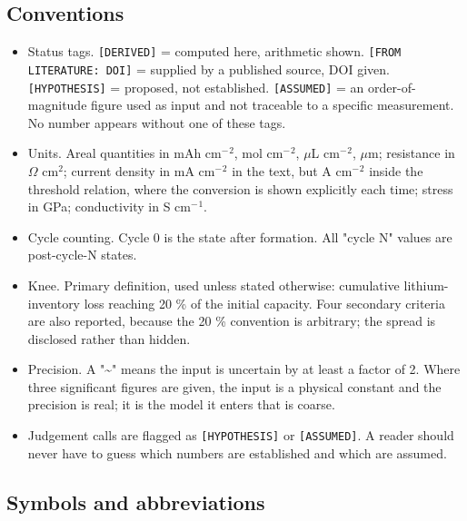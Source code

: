 \documentclass[11pt,a4paper]{article}
\begin{document}
\subsection*{Conventions}


\begin{itemize}
  \item Status tags. \texttt{[DERIVED]} = computed here, arithmetic shown. \texttt{[FROM LITERATU}\hspace{0pt}\texttt{RE: DOI]} = supplied by a published source, DOI given. \texttt{[HYPOTHESIS]} = proposed, not established. \texttt{[ASSUMED]} = an order-of-magnitude figure used as input and not traceable to a specific measurement. No number appears without one of these tags.
  \item Units. Areal quantities in mAh cm\ensuremath{^{-}}\ensuremath{^{2}}, mol cm\ensuremath{^{-}}\ensuremath{^{2}}, \ensuremath{\mu}L cm\ensuremath{^{-}}\ensuremath{^{2}}, \ensuremath{\mu}m; resistance in \ensuremath{\Omega} cm\ensuremath{^{2}}; current density in mA cm\ensuremath{^{-}}\ensuremath{^{2}} in the text, but A cm\ensuremath{^{-}}\ensuremath{^{2}} inside the threshold relation, where the conversion is shown explicitly each time; stress in GPa; conductivity in S cm\ensuremath{^{-}}\ensuremath{^{1}}.
  \item Cycle counting. Cycle 0 is the state after formation. All "cycle N" values are post-cycle-N states.
  \item Knee. Primary definition, used unless stated otherwise: cumulative lithium-inventory loss reaching 20 \% of the initial capacity. Four secondary criteria are also reported, because the 20 \% convention is arbitrary; the spread is disclosed rather than hidden.
  \item Precision. A "\textasciitilde{}" means the input is uncertain by at least a factor of 2. Where three significant figures are given, the input is a physical constant and the precision is real; it is the model it enters that is coarse.
  \item Judgement calls are flagged as \texttt{[HYPOTHESIS]} or \texttt{[ASSUMED]}. A reader should never have to guess which numbers are established and which are assumed.
\end{itemize}


\subsection*{Symbols and abbreviations}
\end{document}
